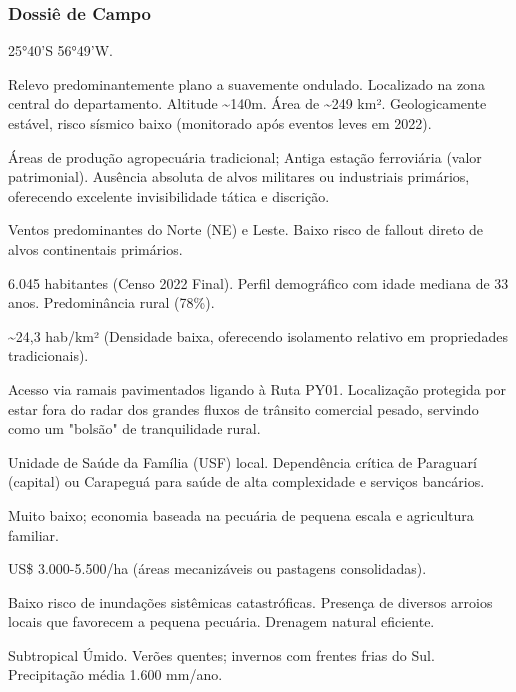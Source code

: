 \subsubsection{Dossiê de Campo}
\begin{description}[style=nextline,leftmargin=0.5cm,font=\bfseries]
\item[Coordenadas]  25°40'S 56°49'W.
\item[Topografia]  Relevo predominantemente plano a suavemente ondulado. Localizado na zona central do departamento. Altitude \textasciitilde 140m. Área de \textasciitilde 249 km². Geologicamente estável, risco sísmico baixo (monitorado após eventos leves em 2022).
\item[Alvos Estratégicos]  Áreas de produção agropecuária tradicional; Antiga estação ferroviária (valor patrimonial). Ausência absoluta de alvos militares ou industriais primários, oferecendo excelente invisibilidade tática e discrição.
\item[Fallout]  Ventos predominantes do Norte (NE) e Leste. Baixo risco de fallout direto de alvos continentais primários.
\item[População]  6.045 habitantes (Censo 2022 Final). Perfil demográfico com idade mediana de 33 anos. Predominância rural (78\%).
\item[Densidade]  \textasciitilde 24,3 hab/\allowbreak km² (Densidade baixa, oferecendo isolamento relativo em propriedades tradicionais).
\item[Vias de Acesso]  Acesso via ramais pavimentados ligando à Ruta PY01. Localização protegida por estar fora do radar dos grandes fluxos de trânsito comercial pesado, servindo como um "bolsão" de tranquilidade rural.
\item[Serviços]  Unidade de Saúde da Família (USF) local. Dependência crítica de Paraguarí (capital) ou Carapeguá para saúde de alta complexidade e serviços bancários.
\item[Custo de Vida]  Muito baixo; economia baseada na pecuária de pequena escala e agricultura familiar.
\item[Preço da Terra]  US\$ 3.000-5.500/\allowbreak ha (áreas mecanizáveis ou pastagens consolidadas).
\item[Hidrologia]  Baixo risco de inundações sistêmicas catastróficas. Presença de diversos arroios locais que favorecem a pequena pecuária. Drenagem natural eficiente.
\item[Clima]  Subtropical Úmido. Verões quentes; invernos com frentes frias do Sul. Precipitação média 1.600 mm/\allowbreak ano.

\end{description}
